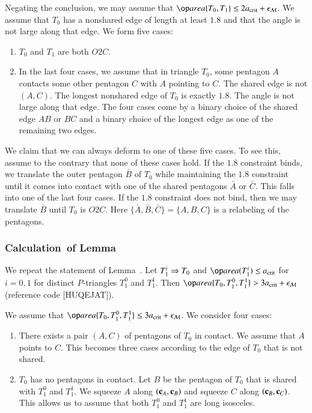 Negating the conclusion, we may assume that $\area\{T_0,T_1\}\le
2\acrit + \epsM$.  We assume that $T_0$ has a nonshared edge of length
at least $1.8$ and that the angle is not large along that edge.  We
form five cases:
\begin{enumerate}  
\item $T_0$ and $T_1$ are both $O2C$.
\item In the last four cases, we assume that in triangle $T_0$, some
  pentagon $A$ contacts some other pentagon $C$ with $A$ pointing to
  $C$.  The shared edge is not $(A,C)$. The longest nonshared edge of
  $T_0$ is exactly $1.8$.  The angle is not large along that edge.
  The four cases come by a binary choice of the shared edge $AB$ or
  $BC$ and a binary choice of the longest edge as one of the remaining
  two edges.
\end{enumerate}

We claim that we can always deform to one of these five cases.  To see
this, assume to the contrary that none of these cases hold.  If the
$1.8$ constraint binds, we translate the outer pentagon $\bar B$ of
$T_0$ while maintaining the $1.8$ constraint until it comes into
contact with one of the shared pentagons $\bar A$ or $\bar C$. This
falls into one of the last four cases.  If the $1.8$ constraint does
not bind, then we may translate $\bar B$ until $T_0$ is $O2C$.  Here
$\{\bar A,\bar B,\bar C\}=\{A,B,C\}$ is a relabeling of the pentagons.

\subsubsection{Calculation~of Lemma~} %

We repeat the statement of Lemma~.  Let $T_1^i\Rightarrow T_0$
and $\area(T_1^i)\le\acrit$ for $i=0,1$ for distinct $P$-triangles
$T_1^0$ and $T_1^1$.  Then $\area\{T_0,T_1^0,T_1^1\} > 3\acrit +
\epsM$ (reference code [HUQEJAT]).

We assume that $\area\{T_0,T_1^0,T_1^1\}\le 3\acrit + \epsM$.  We
consider four cases:
\begin{enumerate}  
\item There exists a pair $(A,C)$ of pentagons of $T_0$ in contact.
  We assume that $A$ points to $C$.  This becomes three cases
  according to the edge of $T_0$ that is not shared.
\item $T_0$ has no pentagons in contact. Let $B$ be
  the pentagon of $T_0$ that is shared with $T_1^0$ and $T_1^1$.  We
  squeeze $A$ along $({\mathbf c}_A,{\mathbf c}_B)$ and squeeze $C$ along $({\mathbf c}_B,{\mathbf c}_C)$.
  This allows us to assume that both $T_1^0$ and $T_1^1$ are long
  isosceles.
\end{enumerate}  


